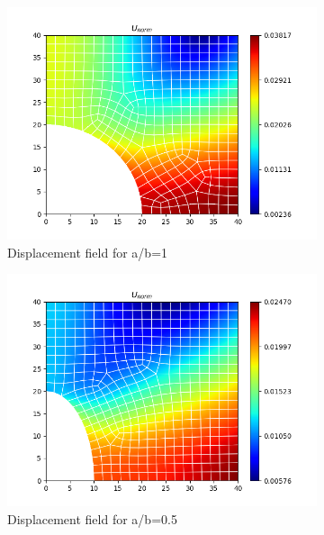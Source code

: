 \documentclass[twoside,twocolumn,10pt]{article}
\begin{document}
\begin{figure}[!ht]
  \centering
  \begin{subfigure}[c]{0.32\textwidth}
    \centering
    \includegraphics[width=1.\linewidth]{Q2_1/Q1_1_2_quad.png}
    \caption{Displacement field for a/b=1}
    \label{fig:disp_1}
  \end{subfigure} 
  \hfill
  \begin{subfigure}[c]{0.32\textwidth}
    \centering
    \includegraphics[width=1.\linewidth]{Q2_1/Q1_0.5_2_quad.png}
    \caption{Displacement field for a/b=0.5}
    \label{fig:disp_05}
  \end{subfigure}
  \hfill
  \begin{subfigure}[c]{0.32\textwidth}

\end{subfigure}
\end{figure}
\end{document}
